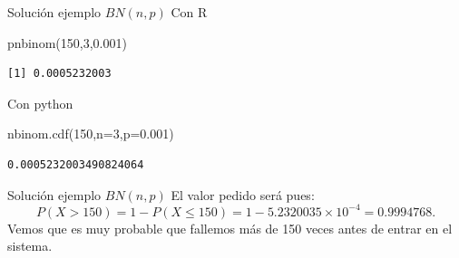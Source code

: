 \documentclass[
  ignorenonframetext,
  aspectratio=169]{beamer}
\newenvironment{Shaded}{\begin{snugshade}}{\end{snugshade}}
\newcommand{\DecValTok}[1]{\textcolor[rgb]{0.68,0.00,0.00}{#1}}
\newcommand{\FloatTok}[1]{\textcolor[rgb]{0.68,0.00,0.00}{#1}}
\newcommand{\FunctionTok}[1]{\textcolor[rgb]{0.28,0.35,0.67}{#1}}
\newcommand{\NormalTok}[1]{\textcolor[rgb]{0.00,0.23,0.31}{#1}}
\newcommand{\OperatorTok}[1]{\textcolor[rgb]{0.37,0.37,0.37}{#1}}
\begin{document}
\begin{frame}[fragile]{Solución ejemplo \(BN(n,p)\)}
\protect\hypertarget{soluciuxf3n-ejemplo-bnnp-1}{}
Con R

\begin{Shaded}
\begin{Highlighting}[]
\FunctionTok{pnbinom}\NormalTok{(}\DecValTok{150}\NormalTok{,}\DecValTok{3}\NormalTok{,}\FloatTok{0.001}\NormalTok{)}
\end{Highlighting}
\end{Shaded}

\begin{verbatim}
[1] 0.0005232003
\end{verbatim}

Con python

\begin{Shaded}
\begin{Highlighting}[]
\NormalTok{nbinom.cdf(}\DecValTok{150}\NormalTok{,n}\OperatorTok{=}\DecValTok{3}\NormalTok{,p}\OperatorTok{=}\FloatTok{0.001}\NormalTok{)}
\end{Highlighting}
\end{Shaded}

\begin{verbatim}
0.0005232003490824064
\end{verbatim}

\begin{frame}{Solución ejemplo \(BN(n,p)\)}
\protect\hypertarget{soluciuxf3n-ejemplo-bnnp-2}{}
El valor pedido será pues: \[
P(X>150)=1-P(X\leq 150)=1-\ensuremath{5.2320035\times 10^{-4}}=0.9994768.
\] Vemos que es muy probable que fallemos más de 150 veces antes de
entrar en el sistema.
\end{frame}
\end{frame}
\end{document}
